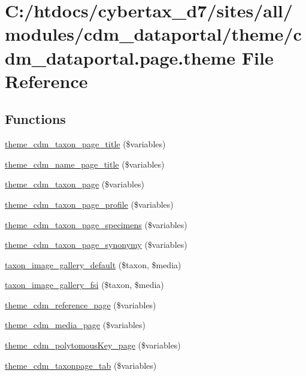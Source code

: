 \hypertarget{cdm__dataportal_8page_8theme}{\section{C\-:/htdocs/cybertax\-\_\-d7/sites/all/modules/cdm\-\_\-dataportal/theme/cdm\-\_\-dataportal.page.\-theme File Reference}
\label{cdm__dataportal_8page_8theme}
}
\subsection*{Functions}
\begin{DoxyCompactItemize}
\item 
\hyperlink{cdm__dataportal_8page_8theme_a14d12a78d8bf4b69f377091eb4abf8fd}{theme\-\_\-cdm\-\_\-taxon\-\_\-page\-\_\-title} (\$variables)
\item 
\hyperlink{cdm__dataportal_8page_8theme_ae6f98554d39f1e60bd7d44f607668247}{theme\-\_\-cdm\-\_\-name\-\_\-page\-\_\-title} (\$variables)
\item 
\hyperlink{cdm__dataportal_8page_8theme_a82655dee87e3351092dd29bfcaf4abc0}{theme\-\_\-cdm\-\_\-taxon\-\_\-page} (\$variables)
\item 
\hyperlink{cdm__dataportal_8page_8theme_a70f254eed9badf48a421fc1ae6bc8d99}{theme\-\_\-cdm\-\_\-taxon\-\_\-page\-\_\-profile} (\$variables)
\item 
\hyperlink{cdm__dataportal_8page_8theme_a23d4f1e653564a1de1f2162293aaefc7}{theme\-\_\-cdm\-\_\-taxon\-\_\-page\-\_\-specimens} (\$variables)
\item 
\hyperlink{cdm__dataportal_8page_8theme_a45d2d164d85026702b625402c522ff1e}{theme\-\_\-cdm\-\_\-taxon\-\_\-page\-\_\-synonymy} (\$variables)
\item 
\hyperlink{cdm__dataportal_8page_8theme_a3b45a50fe2d105513c8fdcbe8b7cadb7}{taxon\-\_\-image\-\_\-gallery\-\_\-default} (\$taxon, \$media)
\item 
\hyperlink{cdm__dataportal_8page_8theme_a854220080ab237d6a621bc7846b37e46}{taxon\-\_\-image\-\_\-gallery\-\_\-fsi} (\$taxon, \$media)
\item 
\hyperlink{cdm__dataportal_8page_8theme_a0fe4ee5933bc2d6e3c6ee3267f31ffa9}{theme\-\_\-cdm\-\_\-reference\-\_\-page} (\$variables)
\item 
\hyperlink{cdm__dataportal_8page_8theme_a4f4dc5a66361f87e06ea9023d20d995a}{theme\-\_\-cdm\-\_\-media\-\_\-page} (\$variables)
\item 
\hyperlink{cdm__dataportal_8page_8theme_a61a811e2acf1a0f4d0bf33af94664e4a}{theme\-\_\-cdm\-\_\-polytomous\-Key\-\_\-page} (\$variables)
\item 
\hyperlink{cdm__dataportal_8page_8theme_acf40a8b47c78e706050394563436aac3}{theme\-\_\-cdm\-\_\-taxonpage\-\_\-tab} (\$variables)
\end{DoxyCompactItemize}


